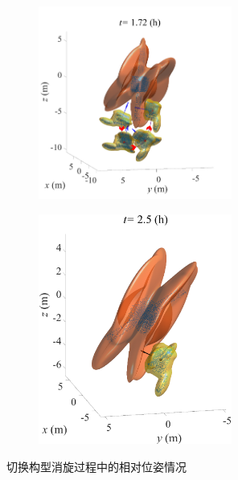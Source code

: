 \documentclass[lang=chs, degree=master, blindreview=false, winfonts=true]{yanputhesis}
\begin{document}
\begin{figure}[htb!]
\begin{minipage}[t]{0.96\textwidth}
		\vspace{10pt}
		\centering
		\begin{subfigure}[t]{0.47\textwidth}
			\centering
			\includegraphics[width = 2.5in]{picture/detumble_tra.pdf}
			\caption{ }
			\label{fig:detumbletra}
		\end{subfigure}\hfill
		\begin{subfigure}[t]{0.47\textwidth}
			\centering
			\includegraphics[width = 2.5in]{picture/detumble_time4.eps}
			\caption{ }
			\label{fig:detumbletime4}
		\end{subfigure}
	\end{minipage}
	\caption{切换构型消旋过程中的相对位姿情况\label{Fig.detumble_pose}}
\end{figure}
\end{document}
